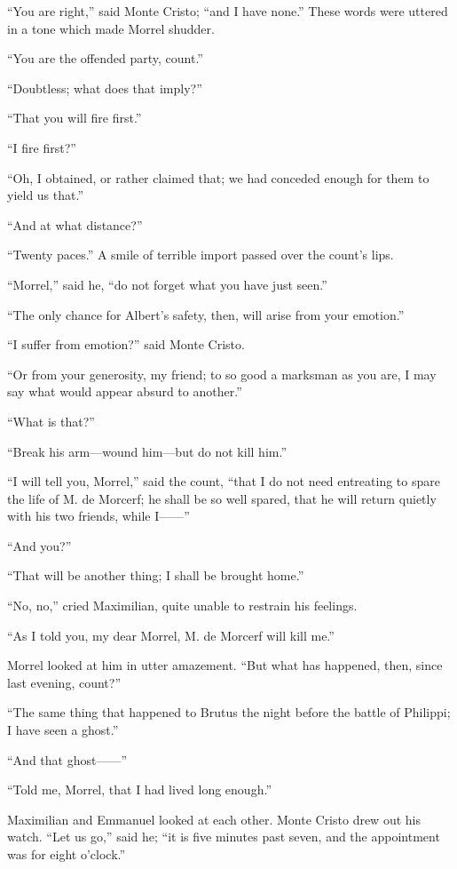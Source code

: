 “You are right,” said Monte Cristo; “and I have none.” These words were
uttered in a tone which made Morrel shudder.

“You are the offended party, count.”

“Doubtless; what does that imply?”

“That you will fire first.”

“I fire first?”

“Oh, I obtained, or rather claimed that; we had conceded enough for
them to yield us that.”

“And at what distance?”

“Twenty paces.” A smile of terrible import passed over the count’s
lips.

“Morrel,” said he, “do not forget what you have just seen.”

“The only chance for Albert’s safety, then, will arise from your
emotion.”

“I suffer from emotion?” said Monte Cristo.

“Or from your generosity, my friend; to so good a marksman as you are,
I may say what would appear absurd to another.”

“What is that?”

“Break his arm—wound him—but do not kill him.”

“I will tell you, Morrel,” said the count, “that I do not need
entreating to spare the life of M. de Morcerf; he shall be so well
spared, that he will return quietly with his two friends, while I——”

“And you?”

“That will be another thing; I shall be brought home.”

“No, no,” cried Maximilian, quite unable to restrain his feelings.

“As I told you, my dear Morrel, M. de Morcerf will kill me.”

Morrel looked at him in utter amazement. “But what has happened, then,
since last evening, count?”

“The same thing that happened to Brutus the night before the battle of
Philippi; I have seen a ghost.”

“And that ghost——”

“Told me, Morrel, that I had lived long enough.”

Maximilian and Emmanuel looked at each other. Monte Cristo drew out his
watch. “Let us go,” said he; “it is five minutes past seven, and the
appointment was for eight o’clock.”

